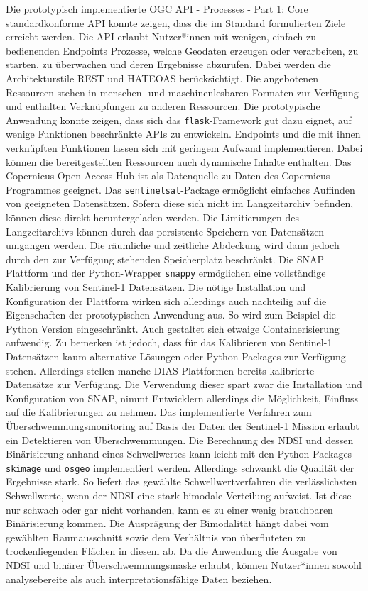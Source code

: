 Die prototypisch implementierte OGC API - Processes - Part 1: Core standardkonforme API konnte zeigen, dass die im Standard formulierten 
Ziele erreicht werden. Die API erlaubt Nutzer*innen mit wenigen, einfach zu bedienenden Endpoints Prozesse, welche Geodaten erzeugen oder 
verarbeiten, zu starten, zu überwachen und deren Ergebnisse abzurufen. Dabei werden die Architekturstile REST und HATEOAS berücksichtigt. 
Die angebotenen Ressourcen stehen in menschen- und maschinenlesbaren Formaten zur Verfügung und enthalten Verknüpfungen zu anderen 
Ressourcen.
Die prototypische Anwendung konnte zeigen, dass sich das \verb|flask|-Framework gut dazu eignet, auf wenige Funktionen beschränkte APIs zu entwickeln. 
Endpoints und die mit ihnen verknüpften Funktionen lassen sich mit geringem Aufwand implementieren. Dabei können die bereitgestellten Ressourcen 
auch dynamische Inhalte enthalten.
Das Copernicus Open Access Hub ist als Datenquelle zu Daten des Copernicus-Programmes geeignet. Das \verb|sentinelsat|-Package ermöglicht einfaches 
Auffinden von geeigneten Datensätzen. Sofern diese sich nicht im Langzeitarchiv befinden, können diese direkt heruntergeladen werden. Die 
Limitierungen des Langzeitarchivs können durch das persistente Speichern von Datensätzen umgangen werden. Die räumliche und 
zeitliche Abdeckung wird dann jedoch durch den zur Verfügung stehenden Speicherplatz beschränkt. 
Die SNAP Plattform und der Python-Wrapper \verb|snappy| ermöglichen eine vollständige Kalibrierung von Sentinel-1 Datensätzen. 
Die nötige Installation und Konfiguration der Plattform wirken sich allerdings 
auch nachteilig auf die Eigenschaften der prototypischen Anwendung aus. So wird zum Beispiel die Python Version eingeschränkt. Auch gestaltet sich 
etwaige Containerisierung aufwendig. Zu bemerken ist jedoch, dass für das Kalibrieren von Sentinel-1 Datensätzen kaum alternative Lösungen oder 
Python-Packages zur Verfügung stehen. Allerdings stellen manche DIAS Plattformen bereits kalibrierte Datensätze zur Verfügung. Die Verwendung  
dieser spart zwar die Installation und Konfiguration von SNAP, nimmt Entwicklern allerdings die Möglichkeit, Einfluss auf die Kalibrierungen zu nehmen.
Das implementierte Verfahren zum Überschwemmungsmonitoring auf Basis der Daten der Sentinel-1 Mission erlaubt ein Detektieren von Überschwemmungen. 
Die Berechnung des NDSI und dessen Binärisierung anhand eines Schwellwertes kann leicht mit den Python-Packages \verb|skimage| und \verb|osgeo| 
implementiert werden. Allerdings schwankt die Qualität der Ergebnisse stark. So liefert das gewählte Schwellwertverfahren die verlässlichsten Schwellwerte, 
wenn der NDSI eine stark bimodale Verteilung aufweist. Ist diese nur schwach oder gar nicht vorhanden, kann es zu einer wenig brauchbaren Binärisierung kommen. 
Die Ausprägung der Bimodalität hängt dabei vom gewählten Raumausschnitt sowie dem Verhältnis von überfluteten zu trockenliegenden Flächen in diesem ab. 
Da die Anwendung die Ausgabe von NDSI und binärer Überschwemmungsmaske erlaubt, können Nutzer*innen sowohl analysebereite als auch interpretationsfähige Daten 
beziehen.  \\

